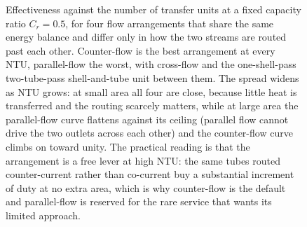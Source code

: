 \begin{figure}[htbp]
\centering
{}
\caption[Effectiveness versus NTU for four arrangements]{Effectiveness against the
number of transfer units at a fixed capacity ratio $C_r=0.5$, for four flow
arrangements that share the same energy balance and differ only in how the two
streams are routed past each other. Counter-flow is the best arrangement at every
NTU, parallel-flow the worst, with cross-flow and the one-shell-pass two-tube-pass
shell-and-tube unit between them. The spread widens as NTU grows: at small area all
four are close, because little heat is transferred and the routing scarcely
matters, while at large area the parallel-flow curve flattens against its ceiling
(parallel flow cannot drive the two outlets across each other) and the counter-flow
curve climbs on toward unity. The practical reading is that the arrangement is a
free lever at high NTU: the same tubes routed counter-current rather than co-current
buy a substantial increment of duty at no extra area, which is why counter-flow is
the default and parallel-flow is reserved for the rare service that wants its limited
approach.}
\label{fig:vol04ch06:arrangement-effectiveness}
\end{figure}
